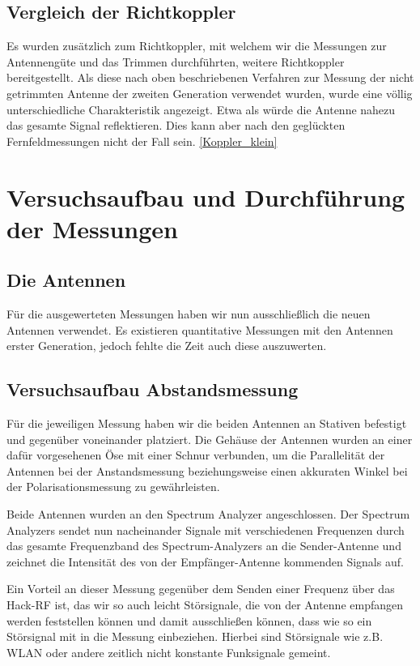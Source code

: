 \documentclass[titlepage,11pt,a4paper,ngerman]{article}
\begin{document}
\subsection{Vergleich der Richtkoppler}

Es wurden zusätzlich zum Richtkoppler, mit welchem wir die Messungen zur Antennengüte und das Trimmen durchführten, weitere Richtkoppler bereitgestellt. Als diese nach oben beschriebenen Verfahren zur Messung der nicht getrimmten Antenne der zweiten Generation verwendet wurden, wurde eine völlig unterschiedliche Charakteristik angezeigt. Etwa als würde die Antenne nahezu das gesamte Signal reflektieren. Dies kann aber nach den geglückten Fernfeldmessungen nicht der Fall sein.
\ref{Koppler_klein}

\section{Versuchsaufbau und Durchführung der Messungen}
\label{Versuchsaufbau} 

\subsection{Die Antennen}

Für die ausgewerteten Messungen haben wir nun ausschließlich die neuen Antennen verwendet. Es existieren quantitative Messungen mit den Antennen erster Generation, jedoch fehlte die Zeit auch diese auszuwerten.

\subsection{Versuchsaufbau Abstandsmessung}

Für die jeweiligen Messung haben wir die beiden Antennen an Stativen befestigt und gegenüber voneinander platziert. Die Gehäuse der Antennen wurden an einer dafür vorgesehenen Öse mit einer Schnur verbunden, um die Parallelität der Antennen bei der Anstandsmessung beziehungsweise einen akkuraten Winkel bei der Polarisationsmessung zu gewährleisten.\par
Beide Antennen wurden an den Spectrum Analyzer angeschlossen. Der Spectrum Analyzers sendet nun nacheinander Signale mit verschiedenen Frequenzen durch das gesamte Frequenzband des Spectrum-Analyzers an die Sender-Antenne und zeichnet die Intensität des von der Empfänger-Antenne kommenden Signals auf.\par
Ein Vorteil an dieser Messung gegenüber dem Senden einer Frequenz über das Hack-RF ist, das wir so auch leicht Störsignale, die von der Antenne empfangen werden feststellen können und damit ausschließen können, dass wie so ein Störsignal mit in die Messung einbeziehen. Hierbei sind Störsignale wie z.B. WLAN oder andere zeitlich nicht konstante Funksignale gemeint.
\end{document}
